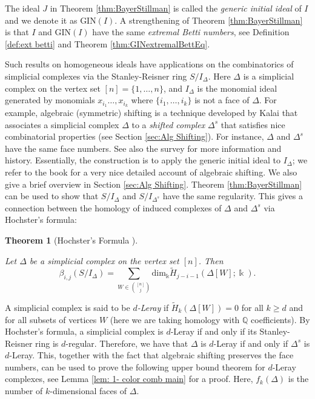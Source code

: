 \documentclass[a4paper, 10pt, reqno, english, ones]{amsart}  %
\newtheorem{theorem}{Theorem}[section]
\theoremstyle{definition}
\theoremstyle{remark}
\begin{document}
The ideal $J$ in Theorem \ref{thm:BayerStillman} is called the \textit{generic initial ideal} of $I$ and we denote it as $\textrm{GIN}(I)$. A strengthening of Theorem \ref{thm:BayerStillman} is that $I$ and $\textrm{GIN}(I)$ have the same \textit{extremal Betti numbers}, see  Definition \ref{def:ext betti} and Theorem \ref{thm:GINextremalBettEq}. 

Such results on homogeneous ideals have applications on the combinatorics of simplicial complexes via the Stanley-Reisner ring $S/I_\Delta$. Here $\Delta$ is a simplicial complex on the vertex set $[n]=\{1,\dots,n\}$, and $I_\Delta$ is the monomial ideal generated by monomials $x_{i_1}\dots,x_{i_k}$ where $\{i_1,\dots,i_k\}$ is not a face of $\Delta$. For example, algebraic (symmetric) shifting is a technique developed by Kalai that associates a simplicial complex $\Delta$ to a \textit{shifted complex} $\Delta^s$ that satisfies nice combinatorial properties (see Section \ref{sec:Alg Shifting}). For instance, $\Delta$ and $\Delta^s$ have the same face numbers. See also the survey \cite{Kalai2002AlgebraicShifting} for more information and history. Essentially, the construction is to apply the generic initial ideal to $I_\Delta$; we refer to the book \cite{herzog2011monomial} for a very nice detailed account of algebraic shifting. We also give a brief overview in Section \ref{sec:Alg Shifting}. Theorem \ref{thm:BayerStillman} can be used to show that $S/I_\Delta$ and $S/I_{\Delta^s}$ have the same regularity. This gives a connection between the homology of induced complexes of $\Delta$ and $\Delta^s$ via Hochster's formula:

\begin{theorem}[Hochster's Formula \cite{HochstersFormula}]\label{thm:HochstersFormula}

Let $\Delta$ be a simplicial complex on the vertex set $[n]$. Then
\[
\beta_{i,j}(S/I_\Delta) = \sum_{W\in {[n] \choose j}} \textrm{dim}_\Bbbk\tilde{H}_{j-i-1}(\Delta[W];\Bbbk ).
\]
    
\end{theorem}

A simplicial complex is said to be \textit{$d$-Leray} if $\tilde{H}_k(\Delta[W])=0$ for all $k\geq d$ and for all subsets of vertices $W$ (here we are taking homology with $\mathbb{Q}$ coefficients). By Hochster's formula, a simplicial complex is $d$-Leray if and only if its Stanley-Reisner ring is $d$-regular. Therefore, we have that $\Delta$ is $d$-Leray if and only if $\Delta^s$ is $d$-Leray. This, together with the fact that algebraic shifting preserves the face numbers,  can be used to prove the following upper bound theorem for $d$-Leray complexes, see Lemma \ref{lem: 1- color comb main} for a proof. Here, $f_k(\Delta)$ is the number of $k$-dimensional faces of $\Delta$.
\end{document}
